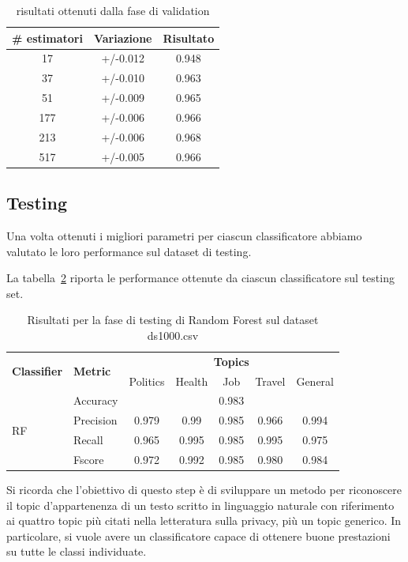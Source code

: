 \begin{table}[h]
\centering
\begin{tabular}{|c|c|c|}
\hline
\textbf{\# estimatori} & \textbf{Variazione} & \textbf{Risultato} \\ \hline
17 & +/-0.012 & 0.948 \\ \hline
37 & +/-0.010 & 0.963 \\ \hline
51 & +/-0.009 & 0.965 \\ \hline
177 & +/-0.006 & 0.966 \\ \hline
213 & +/-0.006 & 0.968 \\ \hline
517 & +/-0.005 & 0.966 \\ \hline
\end{tabular}
\caption{risultati ottenuti dalla fase di validation}
\label{tab:validationresult}
\end{table}
\FloatBarrier

\subsection{Testing}
\label{ssec:testing_Topic}
Una volta ottenuti i migliori parametri per ciascun classificatore abbiamo valutato le loro performance sul dataset di testing.

La tabella~\ref{tbl:training_ds1000} riporta le performance ottenute da ciascun classificatore sul testing set.
\begin{table}[h]
\begin{tabular}{|l|l|c|c|c|c|c|}
\hline
\multirow{2}{*}{\textbf{Classifier}} & \multirow{2}{*}{\textbf{Metric}} & \multicolumn{5}{c|}{\textbf{Topics}} \\ \cline{3-7} 
 &  & Politics & Health & Job & Travel & General \\ \hline
\multirow{4}{*}{RF} & Accuracy & \multicolumn{5}{c|}{0.983} \\ \cline{2-7} 
 & Precision & 0.979 & 0.99 & 0.985 & 0.966 & 0.994 \\ \cline{2-7} 
 & Recall & 0.965 & 0.995 & 0.985  & 0.995 & 0.975 \\ \cline{2-7} 
 & Fscore & 0.972 & 0.992 & 0.985 & 0.980 & 0.984 \\ \hline
\end{tabular}
\caption{Risultati per la fase di testing di Random Forest sul dataset ds1000.csv}
\label{tbl:training_ds1000}
\end{table}
\FloatBarrier
Si ricorda che l'obiettivo di questo step è di sviluppare un metodo per riconoscere il topic d'appartenenza di un testo scritto in linguaggio naturale con riferimento ai quattro topic più citati nella letteratura sulla privacy\cite{looseTweets,dontTweetThis}, più un topic generico. In particolare, si vuole avere un classificatore capace di ottenere buone prestazioni su tutte le classi individuate. 

